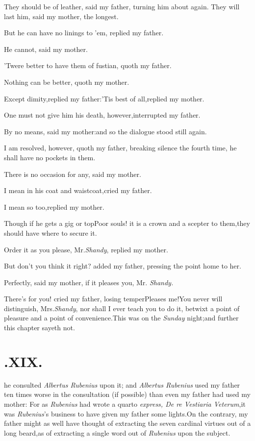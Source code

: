 \documentclass{article}
\begin{document}
\tsh They should be of leather, said my father, turning
him about again.\tsk{}
They will last him, said my mother, the longest.

But he can have no linings to ’em, replied my
father.\tsh

He cannot, said my mother.

’Twere better to have them of fustian, quoth my
father.

Nothing can be better, quoth my mother.\tsh

\tsh Except dimity,\tsk replied my
father:\tsh ’Tis best of all,\tsk replied my
mother.

\tsh One must not give him his death,
however,\tsk interrupted my father.

By no means, said my mother:\tsh and so the dialogue
stood still again.

I am resolved, however, quoth my\break 
father, breaking silence the fourth time,\break
he shall have no pockets in them.\tsh

\tsh There is no occasion for any,\break
said my mother.\tsh

I mean in his coat and waistcoat,\tsk cried my father.

\tsh I mean so too,\tsk replied my mother.

\tsh Though if he gets a gig or top\break\tsh Poor
souls! it is a crown and a scepter to them,\tsk they should have
where to secure it.\tsh

Order it as you please, Mr.\@ \textit{Shandy}, replied my
mother.\tsh{}

\tsh But don’t you think it right? added my
father, pressing the point home to her.

Perfectly, said my mother, if it pleases you, Mr.
\textit{Shandy.}\tsh

\tsh There’s for you! cried my father, losing
temper\tsh Pleases me!\tsh You never will
distinguish, Mrs.\@ \textit{Shandy}, nor shall I ever teach you to do it, betwixt a point of
pleasure and a point of convenience.\tsh This was on the
\textit{Sunday} night;\tsh and further this chapter sayeth
not.

\smallskip

\section{.\enspace XIX.}

 \hbox{}\break
\hbox{}\break\tsk he consulted
\textit{Albertus Rubenius} upon it; and \textit{Albertus Rubenius} used
my father ten times worse in the consultation (if possible) than
even my father had used my mother: For as \textit{Rubenius} had wrote
a quarto \textit{express, De re Vestiaria Veterum},\tsk it was
\textit{Rubenius}’s business to have given my father some
lights.\tsk On the contrary, my father might as well have thought
of extracting the seven cardinal virtues out of a long
beard,\tsk as of extracting a single word out of \textit{Rubenius}
upon the subject.
\end{document}
